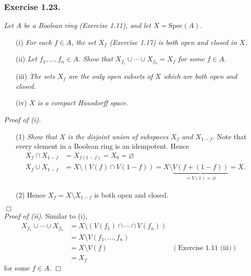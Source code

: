 \documentclass{article}
\begin{document}



\subsubsection*{Exercise 1.23.}
\emph{Let $A$ be a Boolean ring (Exercise 1.11), and let $X = \mathrm{Spec}(A)$.}
\begin{enumerate}
\item[(i)]
  \emph{For each $f \in A$, the set $X_f$ (Exercise 1.17) is both open and closed in $X$.}

\item[(ii)]
  \emph{Let $f_1, \ldots, f_n \in A$.
  Show that $X_{f_1} \cup \cdots \cup X_{f_n} = X_f$ for some $f \in A$.}

\item[(iii)]
  \emph{The sets $X_f$ are the only open subsets of $X$ which are both open and closed.}

\item[(iv)]
  \emph{$X$ is a compact Hausdorff space.} \\
\end{enumerate}



\emph{Proof of (i).}
\begin{enumerate}
\item[(1)]
  \emph{Show that $X$ is the disjoint union of subspaces $X_f$ and $X_{1-f}$.}
  Note that every element in a Boolean ring is an idempotent.
  Hence
  \begin{align*}
    X_f \cap X_{1-f}
    &= X_{f(1-f)} = X_0 = \varnothing \\
    X_f \cup X_{1-f}
    &= X \setminus (V(f) \cap V(1-f))
    = X \setminus \underbrace{V(f + (1-f))}_{= V(1) = \varnothing}
    = X.
  \end{align*}

\item[(2)]
  Hence $X_f = X \setminus X_{1-f}$ is both open and closed.
\end{enumerate}
$\Box$ \\



\emph{Proof of (ii).}
  Similar to (i),
  \begin{align*}
    X_{f_1} \cup \cdots \cup X_{f_n}
    &= X \setminus (V(f_1) \cap \cdots \cap V(f_n)) \\
    &= X \setminus V(f_1, \ldots, f_n) \\
    &= X \setminus V(f)
      &(\text{Exercise 1.11 (iii)}) \\
    &= X_f
  \end{align*}
  for some $f \in A$.
$\Box$ \\
\end{document}

